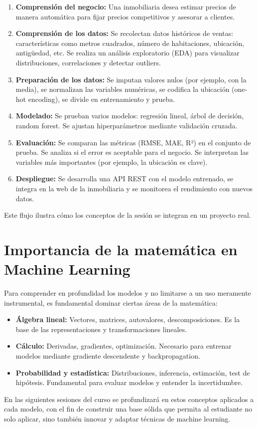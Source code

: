 \documentclass[12pt,a4paper,openany,oneside]{book}
\begin{document}
\begin{enumerate}
    \item \textbf{Comprensión del negocio:} Una inmobiliaria desea estimar precios de manera automática para fijar precios competitivos y asesorar a clientes.
    \item \textbf{Comprensión de los datos:} Se recolectan datos históricos de ventas: características como metros cuadrados, número de habitaciones, ubicación, antigüedad, etc. Se realiza un análisis exploratorio (EDA) para visualizar distribuciones, correlaciones y detectar outliers.
    \item \textbf{Preparación de los datos:} Se imputan valores nulos (por ejemplo, con la media), se normalizan las variables numéricas, se codifica la ubicación (one-hot encoding), se divide en entrenamiento y prueba.
    \item \textbf{Modelado:} Se prueban varios modelos: regresión lineal, árbol de decisión, random forest. Se ajustan hiperparámetros mediante validación cruzada.
    \item \textbf{Evaluación:} Se comparan las métricas (RMSE, MAE, R²) en el conjunto de prueba. Se analiza si el error es aceptable para el negocio. Se interpretan las variables más importantes (por ejemplo, la ubicación es clave).
    \item \textbf{Despliegue:} Se desarrolla una API REST con el modelo entrenado, se integra en la web de la inmobiliaria y se monitorea el rendimiento con nuevos datos.
\end{enumerate}

Este flujo ilustra cómo los conceptos de la sesión se integran en un proyecto real.

\section{Importancia de la matemática en Machine Learning}
Para comprender en profundidad los modelos y no limitarse a un uso meramente instrumental, es fundamental dominar ciertas áreas de la matemática:

\begin{itemize}
    \item \textbf{Álgebra lineal:} Vectores, matrices, autovalores, descomposiciones. Es la base de las representaciones y transformaciones lineales.
    \item \textbf{Cálculo:} Derivadas, gradientes, optimización. Necesario para entrenar modelos mediante gradiente descendente y backpropagation.
    \item \textbf{Probabilidad y estadística:} Distribuciones, inferencia, estimación, test de hipótesis. Fundamental para evaluar modelos y entender la incertidumbre.
\end{itemize}

En las siguientes sesiones del curso se profundizará en estos conceptos aplicados a cada modelo, con el fin de construir una base sólida que permita al estudiante no solo aplicar, sino también innovar y adaptar técnicas de machine learning.
\end{document}
